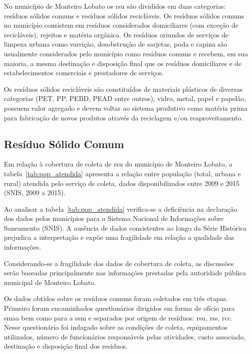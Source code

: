 	No município de Monteiro Lobato os \gls{rsu} são divididos em duas categorias: resíduos sólidos comuns e resíduos sólidos recicláveis. Os resíduos sólidos comuns no município consistem em resíduos considerados domiciliares (com exceção de recicláveis), rejeitos e matéria orgânica. 
	Os resíduos oriundos de serviços de limpeza urbana como varrição, desobstrução de sarjetas, poda e capina são usualmente considerados pelo município como resíduos comuns e recebem, em sua maioria, a mesma destinação e disposição final que os resíduos domiciliares e de estabelecimentos comerciais e prestadores de serviços.
	
	Os resíduos sólidos recicláveis são constituídos de materiais plásticos de diversas categorias (PET, PP, PEBD, PEAD entre outros), vidro, metal, papel e papelão, possuem valor agregado e devem voltar ao sistema produtivo como matéria prima para fabricação de novos produtos através da reciclagem e/ou reaproveitamento.
	
	\subsection{Resíduo Sólido Comum}
	
	Em relação à cobertura de coleta de \gls{rsu} do município de Monteiro Lobato, a tabela~\ref{tab:pop_atendida} apresenta a relação entre população (total, urbana e rural) atendida pelo serviço de coleta, dados disponibilizados entre 2009 e 2015 (SNIS, 2009 a 2015).
	
	
	
	Ao analisar a tabela~\ref{tab:pop_atendida} verifica-se a deficiência na declaração dos dados pelos municípios para o Sistema Nacional de Informações sobre Saneamento (SNIS). A ausência de dados consistentes ao longo da Série Histórica prejudica a interpretação e expõe uma fragilidade em relação a qualidade das informações.
	
	Considerando-se a fragilidade dos dados de cobertura de coleta, as discussões serão baseadas principalmente nas informações prestadas pela autoridade pública municipal de Monteiro Lobato.
	
	Os dados obtidos sobre os resíduos comuns foram coletados em três etapas. Primeiro foram encaminhados questionários dirigidos em forma de ofício para \gls{smaa} bem como para a \gls{ssm} e separados por origem de resíduos: \gls{rsu}, \gls{rss}, \gls{rcc}. Nesse questionário foi indagado sobre as condições de coleta, equipamentos utilizados, número de funcionários responsáveis pelas atividades, custo associado, destinação e disposição final dos resíduos.
	
